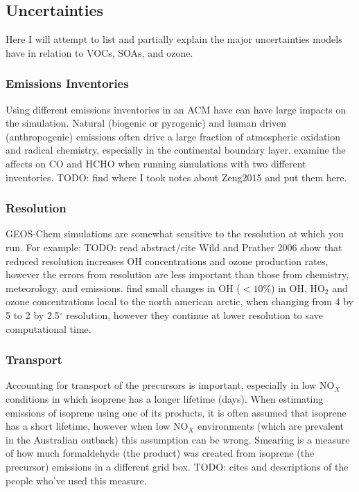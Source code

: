   \subsection{Uncertainties}
    Here I will attempt to list and partially explain the major uncertainties models have in relation to  VOCs, SOAs, and ozone. 
    
    \subsubsection{Emissions Inventories}
      Using different emissions inventories in an ACM have can have large impacts on the simulation.
      Natural (biogenic or pyrogenic) and human driven (anthropogenic) emissions often drive a large fraction of atmospheric oxidation and radical chemistry, especially in the continental boundary layer.
      \cite{Zeng2015} examine the affects on CO and HCHO when running simulations with two different inventories.
      TODO: find where I took notes about Zeng2015 and put them here.
    
    \subsubsection{Resolution}
      GEOS-Chem simulations are somewhat sensitive to the resolution at which you run.
      For example: TODO: read abstract/cite Wild and Prather 2006 show that reduced resolution increases OH concentrations and ozone production  rates, however the errors from resolution are less important than those from chemistry, meteorology, and emissions. 
      \cite{Christian2017} find small changes in OH ($<10$\%) in OH, HO$_2$ and ozone concentrations local to the north american arctic, when changing from 4 by 5 to 2 by 2.5$^{\circ}$ resolution, however they continue at lower resolution to save computational time.
    
    \subsubsection{Transport}
      Accounting for transport of the precursors is important, especially in low NO$_X$ conditions in which isoprene has a longer lifetime (days).
      When estimating emissions of isoprene using one of its products, it is often assumed that isoprene has a short lifetime, however when low NO$_X$ environments (which are prevalent in the Australian outback) this assumption can be wrong.
      Smearing is a measure of how much formaldehyde (the product) was created from isoprene (the precursor) emissions in a different grid box. 
      TODO: cites and descriptions of the people who've used this measure.
    
